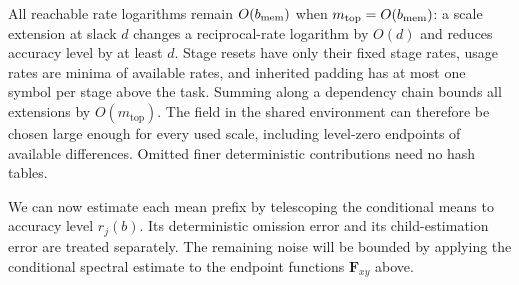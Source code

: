 \documentclass[11pt]{article}
\numberwithin{equation}{section}
\theoremstyle{definition}
\theoremstyle{remark}
\begin{document}
All reachable rate logarithms remain $O({b_{\rm mem}})$ when ${m}_{\mathrm{top}}=O({b_{\rm mem}})$:
a scale extension at slack $d$ changes a reciprocal-rate logarithm by
$O(d)$ and reduces accuracy level by at least $d$.  Stage resets have only their
fixed stage rates, usage rates are minima of available rates, and inherited
padding has at most one symbol per stage above the task.  Summing along a
dependency chain bounds all extensions by $O({m}_{\mathrm{top}})$.  The field in
the shared environment can therefore be chosen large enough for every
used scale, including level-zero endpoints of available differences.
Omitted finer deterministic contributions need no hash tables.


We can now estimate each mean prefix by telescoping the conditional
means to accuracy level ${r}_j(b)$.  Its deterministic omission error and its
child-estimation error are treated separately.  The remaining noise
will be bounded by applying the conditional spectral estimate to the
endpoint functions ${\mathbf{F}}_{xy}$ above.
\end{document}
